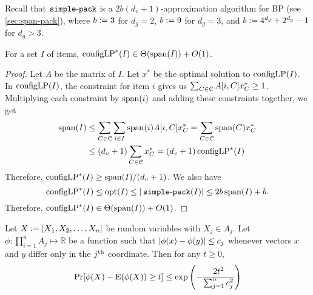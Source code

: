 Recall that $\operatorname{\mathtt{simple-pack}}$ is a $2b(d_v+1)$-approximation algorithm for  BP
(see \cref{sec:span-pack}), where $b := 3$ for $d_g=2$,
$b := 9$ for $d_g=3$, and $b := 4^{d_g}+2^{d_g}-1$ for $d_g > 3$.

\begin{lemma}
\label{thm:clp-vs-span}
For a set $I$ of  items,
$\operatorname{configLP}^*(I) \in \Theta(\operatorname{span}(I)) + O(1)$.
\end{lemma}
\begin{proof}
Let $A$ be the \config{} matrix of $I$.
Let $x^*$ be the optimal solution to $\operatorname{configLP}(I)$.
In $\operatorname{configLP}(I)$, the constraint for item $i$ gives us
$\sum_{C \in \mathcal{C}} A[i, C] x^*_C \ge 1$.
Multiplying each constraint by $\operatorname{span}(i)$ and adding these constraints together, we get
\begin{align*}
\operatorname{span}(I) &\le \sum_{C \in \mathcal{C}} \sum_{i \in I} \operatorname{span}(i) A[i, C] x^*_C
= \sum_{C \in \mathcal{C}} \operatorname{span}(C) x^*_C
\\ &\le (d_v+1) \sum_{C \in \mathcal{C}} x^*_C = (d_v+1)\operatorname{configLP}^*(I)
\end{align*}
Therefore, $\operatorname{configLP}^*(I) \ge \operatorname{span}(I)/(d_v+1)$.
We also have
\[ \operatorname{configLP}^*(I) \le \operatorname{opt}(I) \le |\operatorname{\mathtt{simple-pack}}(I)| \le 2b\operatorname{span}(I)+b. \]
Therefore, $\operatorname{configLP}^*(I) \in \Theta(\operatorname{span}(I)) + O(1)$.
\end{proof}

\begin{lemma}
\label{thm:ind-bdi}
Let $X := [X_1, X_2, \ldots, X_n]$ be random variables with $X_j \in A_j$.
Let $\phi: \prod_{i=1}^n A_j \mapsto \mathbb{R}$ be a function such that
$\left\lvert \phi(x) - \phi(y) \right\rvert \le c_j$
whenever vectors $x$ and $y$ differ only in the $j^{\textrm{th}}$ coordinate.
Then for any $t \ge 0$,
\[ \Pr[ \phi(X) - \operatorname*{E}(\phi(X)) \ge t ] \le \exp\left(-\frac{2t^2}{\sum_{j=1}^n c_j^2}\right) \]
\end{lemma}

